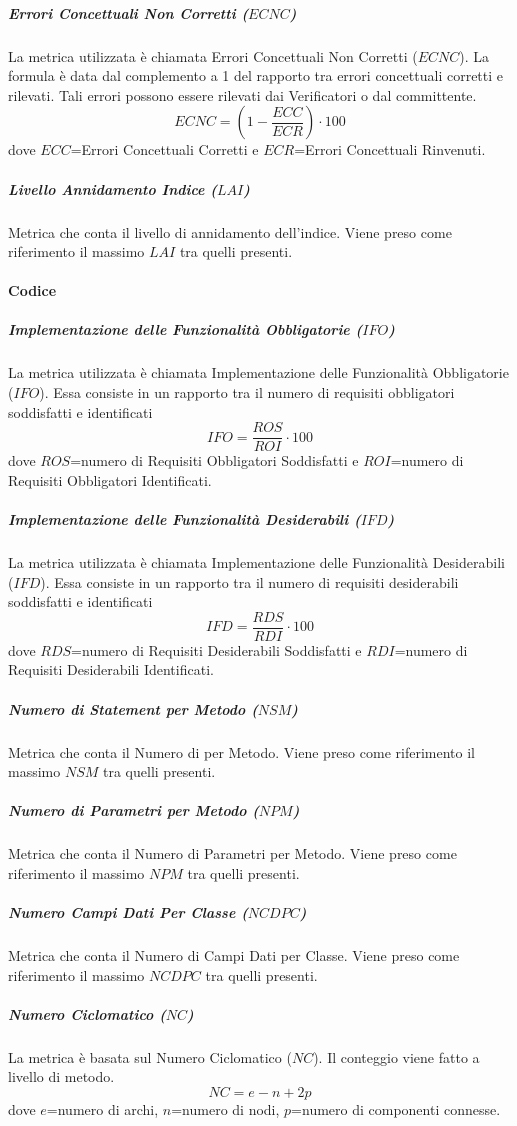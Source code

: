 				\subparagraph{Errori Concettuali Non Corretti ($ECNC$)} \label{ECNC}
				La metrica utilizzata è chiamata Errori Concettuali Non Corretti ($ECNC$). La formula è data dal complemento a 1 del rapporto tra errori concettuali corretti e rilevati. Tali errori possono essere rilevati dai Verificatori o dal committente.
				$$ECNC=\left(1-\frac{ECC}{ECR}\right)\cdot100$$
				dove $ECC$=Errori Concettuali Corretti e $ECR$=Errori Concettuali Rinvenuti.
				\subparagraph{Livello Annidamento Indice ($LAI$)} \label{LAI}
				Metrica che conta il livello di annidamento dell’indice.
				Viene preso come riferimento il massimo $LAI$ tra quelli presenti.
				
			\paragraph{Codice}
				\subparagraph{Implementazione delle Funzionalità Obbligatorie ($IFO$)} \label{IFO}
				La metrica utilizzata è chiamata Implementazione delle Funzionalità Obbligatorie ($IFO$). Essa consiste in un rapporto tra il numero di requisiti obbligatori soddisfatti e identificati
				$$IFO= \frac{ROS}{ROI}\cdot 100$$
				dove $ROS$=numero di Requisiti Obbligatori Soddisfatti e $ROI$=numero di Requisiti Obbligatori Identificati.
				\subparagraph{Implementazione delle Funzionalità Desiderabili ($IFD$)} \label{IFD}
				La metrica utilizzata è chiamata Implementazione delle Funzionalità Desiderabili ($IFD$). Essa consiste in un rapporto tra il numero di requisiti desiderabili soddisfatti e identificati
				$$IFD= \frac{RDS}{RDI}\cdot 100$$
				dove $RDS$=numero di Requisiti Desiderabili Soddisfatti e $RDI$=numero di Requisiti Desiderabili Identificati.
				\subparagraph{Numero di Statement per Metodo ($NSM$)} \label{NSM}
				Metrica che conta il Numero di  per Metodo.
				Viene preso come riferimento il massimo $NSM$ tra quelli presenti.
				\subparagraph{Numero di Parametri per Metodo ($NPM$)} \label{NPM}
				Metrica che conta il Numero di Parametri per Metodo.
				Viene preso come riferimento il massimo $NPM$ tra quelli presenti.
				\subparagraph{Numero Campi Dati Per Classe ($NCDPC$)} \label{NCDPC}
				Metrica che conta il Numero di Campi Dati per Classe.
				Viene preso come riferimento il massimo $NCDPC$ tra quelli presenti.
				\subparagraph{Numero Ciclomatico ($NC$)} \label{NC}
				La metrica è basata sul Numero Ciclomatico ($NC$). Il conteggio viene fatto a livello di metodo.
				$$NC=e-n+2p$$
				dove $e$=numero di archi, $n$=numero di nodi, $p$=numero di componenti connesse.\\
